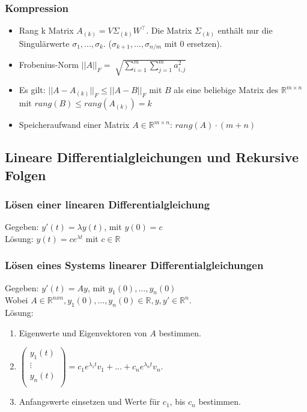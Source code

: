 \documentclass[6pt,a4paper]{scrartcl}
\begin{document}
\begin{multicols*}{4}
\subsubsection{Kompression}
\begin{itemize}\itemsep0pt
\item Rang k Matrix $A_{(k)}=V\Sigma_{(k)}W^\top$. Die Matrix $\Sigma_{(k)}$ enthält nur die Singulärwerte $\sigma_1, ...,\sigma_k$. ($\sigma_{k+1}, ...,\sigma_{n/m}$ mit 0 ersetzen).\\
\item Frobenius-Norm $|| A ||_F = \sqrt[]{\sum_{i=1}^{m} \sum_{j=1}^{m} {a^{2}_{i,j}}}$\\
\item Es gilt: $|| A-A_{(k)} ||_F \leq || A-B ||_F$ mit $B$ als eine beliebige Matrix des $\mathbb{R}^{m\times n}$ mit $rang(B) \leq rang(A_{(k)}) = k$
\item Speicheraufwand einer Matrix $A\in \mathbb{R}^{m\times n}$: $rang(A) \cdot (m+n)$
\end{itemize}
\subsection{Lineare Differentialgleichungen und Rekursive Folgen}
\subsubsection{Lösen einer linearen Differentialgleichung}
Gegeben: $y'(t) = \lambda y(t)$, mit $y(0) = c$\\
Lösung: $y(t) = ce^{\lambda t}$ mit $c \in \mathbb R$\\
\subsubsection{Lösen eines Systems linearer Differentialgleichungen}
Gegeben: $y'(t) = Ay$, mit $y_1(0) , ..., y_n(0)$\\ 
Wobei $A \in \mathbb R^{nxn}, y_1(0) , ..., y_n(0) \in \mathbb R, y,y'\in\mathbb R^n$.\\
Lösung:\\
\begin{enumerate}
	\item Eigenwerte und Eigenvektoren von $A$ bestimmen.
	\item $\begin{pmatrix}
	y_1(t)\\
	\vdots\\
	y_n(t) \\
	\end{pmatrix}
	= c_1e^{\lambda_1t}v_1+...+c_ne^{\lambda_nt}v_n$.
	\item Anfangswerte einsetzen und Werte für $c_1$, bis $c_n$ bestimmen.
\end{enumerate}

\end{multicols*}
\end{document}
